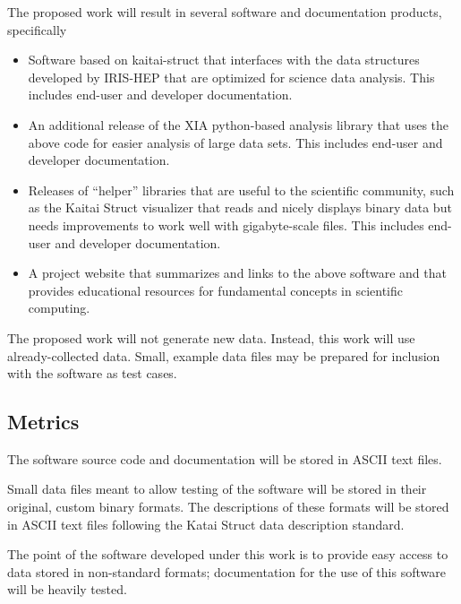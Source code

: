 \documentclass[11pt,oneside]{memoir}
\begin{document}
The proposed work will result in several software and documentation products, specifically

\begin{itemize}
    \item Software based on kaitai-struct that interfaces with the data structures developed by IRIS-HEP that are optimized for science data analysis.  This includes end-user and developer documentation.
    \item An additional release of the XIA python-based analysis library that uses the above code for easier analysis of large data sets.  This includes end-user and developer documentation.
    \item Releases of ``helper'' libraries that are useful to the scientific community, such as the Kaitai Struct visualizer that reads and nicely displays binary data but needs improvements to work well with gigabyte-scale files.  This includes end-user and developer documentation.
    \item A project website that summarizes and links to the above software and that provides educational resources for fundamental concepts in scientific computing.
\end{itemize}

The proposed work will not generate new data.  Instead, this work will use already-collected data.  Small, example data files may be prepared for inclusion with the software as test cases.

\subsection{Metrics}
The software source code and documentation will be stored in ASCII text files.  

Small data files meant to allow testing of the software will be stored in their original, custom binary formats.  The descriptions of these formats will be stored in ASCII text files following the Katai Struct data description standard.

The point of the software developed under this work is to provide easy access to data stored in non-standard formats; documentation for the use of this software will be heavily tested.

\end{document}

